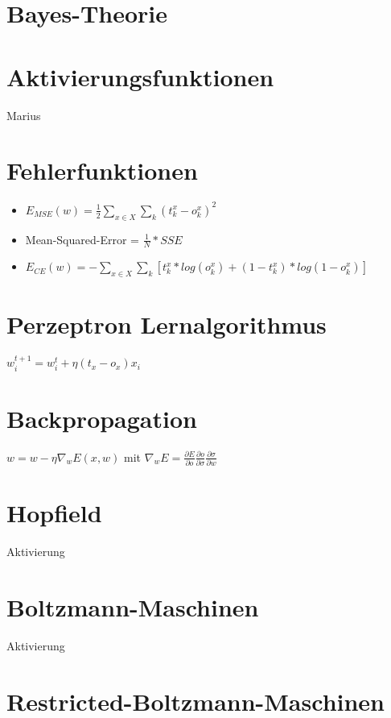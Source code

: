 \documentclass[paper=a4, fontsize=11pt]{scrartcl} %
\begin{document}
\section{Bayes-Theorie}

\section{Aktivierungsfunktionen}

Marius


\section{Fehlerfunktionen}

\begin{itemize}
\item $E_{MSE}(w) = \frac{1}{2} \sum\limits_{x \in X} \sum\limits_k (t^x_k - o^x_k)^2$
\item Mean-Squared-Error = $\frac{1}{N} * SSE$
\item $E_{CE}(w) = - \sum\limits_{x \in X} \sum\limits_k [t^x_k * log(o^x_k) + (1-t^x_k)*log(1-o^x_k)]$
\end{itemize}

\section{Perzeptron Lernalgorithmus}

$w_{i}^{t+1} = w_i^t + \eta (t_x - o_x) x_i$

\section{Backpropagation}

$w = w - \eta \nabla_w E(x,w)$ mit $\nabla_w E = \frac{\partial E}{\partial o} \frac{\partial o}{\partial \sigma} \frac{\partial \sigma}{\partial w}$

\section{Hopfield}

Aktivierung


\section{Boltzmann-Maschinen}

Aktivierung

\section{Restricted-Boltzmann-Maschinen}
\end{document}
